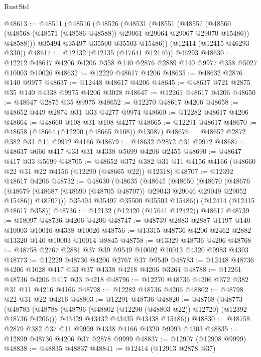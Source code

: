 \begin{lexlean}{RustStd}
\begin{coremodule}
{\begin{coremodule}
{{{{{{{{{{{{{{{{{{{{{{{{{{{{{{{{{{{{{{{{{{{{{{{{{{@48613 := @48511
    (@48516
      (@48526
        (@48531
          (@48551
            (@48557
              (@48560 (@48568 (@48571 (@48586 @48588)) @29061 @29064 @29067 @29070 @15486))
              @48588)))
        @35494
        @35497
        @35500
        @35503
        @15486))
    (@12414 (@12415 @46293 @330))
@48617 := @12132 (@12135 (@17641 @12140)) @46293
@48630 := @12212 @48617 @4206 @4206 @358 @140 @2876 @2889 @140 @9977 @358 @5027 @10003 @10026
@48632 := @12229 @48617 @4206
@48635 := @48632 @2876 @140 @9977
@48637 := @12448 @48617 @4206
@48645 := @48637 @721 @2875 @35 @140 @4338 @9975 @4206 @3028
@48647 := @12261 @48617 @4206
@48650 := @48647 @2875 @35 @9975
@48652 := @12270 @48617 @4206
@48658 := @48652 @449 @2874 @31 @33 @4277 @9974
@48660 := @12282 @48617 @4206
@48664 := @48660 @108 @31 @108 @4277
@48665 := @12291 @48617
@48670 := @48658 (@48664 (@12290 (@48665 @108)) @13087)
@48676 := @48652 @2872 @382 @31 @11 @9972 @4166
@48679 := @48632 @2872 @31 @9972
@48687 := @48637 @666 @417 @33 @31 @4338 @5699 @4206 @2455
@48690 := @48647 @417 @33 @5699
@48705 := @48652
    @372
    @382
    @31
    @11
    @4156
    @4166
    (@48660 @22 @31 @22 @4156 (@12290 (@48665 @22)) @12318)
@48707 := @12392 @48617 @4206
@48732 := @48630
    (@48635
      (@48645
        (@48650
          (@48670
            (@48676
              (@48679 (@48687 (@48690 (@48705 @48707)) @29043 @29046 @29049 @29052 @15486))
              @48707)))
        @35494
        @35497
        @35500
        @35503
        @15486))
    (@12414 (@12415 @48617 @358))
@48736 := @12132 (@12420 (@17641 @12422)) @48617
@48739 := @18097 @48736 @4206 @4206
@48747 := @48739 @2883 @2887 @1197 @140 @10003 @10016 @4338 @10026
@48756 := @13315 @48736 @4206 @2462 @2882 @13320 @140 @10003 @10014 @8845
@48758 := @13329 @48736 @4206
@48768 := @48758 @2767 @2881 @37 @39 @9549 @10002 @10013 @4320 @9983 @4303
@48773 := @12229 @48736 @4206 @2767 @37 @9549
@48783 := @12448 @48736 @4206 @1028 @417 @33 @37 @4338 @4218 @4206 @3264
@48788 := @12261 @48736 @4206 @417 @33 @4218
@48796 := @12270 @48736 @4206 @372 @382 @31 @11 @4216 @4166
@48798 := @12282 @48736 @4206
@48802 := @48798 @22 @31 @22 @4216
@48803 := @12291 @48736
@48820 := @48768
    (@48773
      (@48783
        (@48788 (@48796 (@48802 (@12290 (@48803 @22)) @12720) (@12392 @48736 @4206)))
        @43429
        @43432
        @43435
        @43438
        @15486))
@48830 := @48758 @2879 @382 @37 @11 @9999 @4338 @4166 @4320 @9993 @4303
@48835 := @12899 @48736 @4206 @37 @2878 @9999
@48837 := @12907 (@12908 @9999)
@48838 := @48835 @48837
@48841 := @12414 (@12913 @2878 @37)
}}}}}}}}}}}}}}}}}}}}}}}}}}}}}}}}}}}}}}}}}}}}}}}}}}
\end{coremodule}}
\end{coremodule}
\end{lexlean}
